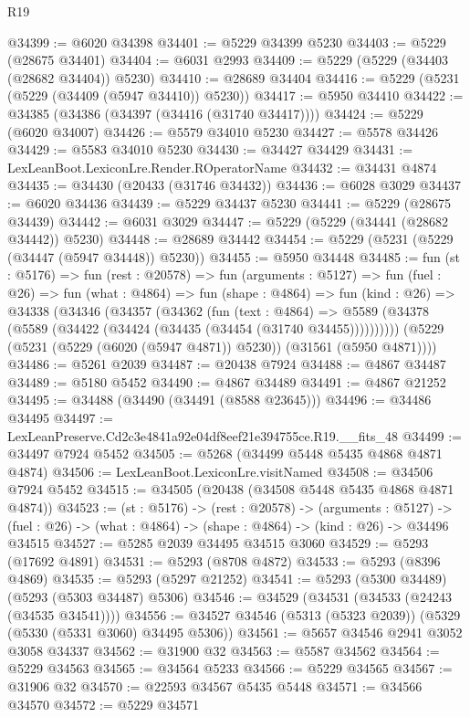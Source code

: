 \begin{lexlean}{R19}
\begin{coremodule}
@34399 := @6020 @34398
@34401 := @5229 @34399 @5230
@34403 := @5229 (@28675 @34401)
@34404 := @6031 @2993
@34409 := @5229 (@5229 (@34403 (@28682 @34404)) @5230)
@34410 := @28689 @34404
@34416 := @5229 (@5231 (@5229 (@34409 (@5947 @34410)) @5230))
@34417 := @5950 @34410
@34422 := @34385 (@34386 (@34397 (@34416 (@31740 @34417))))
@34424 := @5229 (@6020 @34007)
@34426 := @5579 @34010 @5230
@34427 := @5578 @34426
@34429 := @5583 @34010 @5230
@34430 := @34427 @34429
@34431 := LexLeanBoot.LexiconLre.Render.ROperatorName
@34432 := @34431 @4874
@34435 := @34430 (@20433 (@31746 @34432))
@34436 := @6028 @3029
@34437 := @6020 @34436
@34439 := @5229 @34437 @5230
@34441 := @5229 (@28675 @34439)
@34442 := @6031 @3029
@34447 := @5229 (@5229 (@34441 (@28682 @34442)) @5230)
@34448 := @28689 @34442
@34454 := @5229 (@5231 (@5229 (@34447 (@5947 @34448)) @5230))
@34455 := @5950 @34448
@34485 := fun (st : @5176) =>
  fun (rest : @20578) =>
  fun (arguments : @5127) =>
  fun (fuel : @26) =>
  fun (what : @4864) =>
  fun (shape : @4864) =>
  fun (kind : @26) =>
  @34338
    (@34346
      (@34357
        (@34362
          (fun (text : @4864) =>
          @5589 (@34378 (@5589 (@34422 (@34424 (@34435 (@34454 (@31740 @34455))))))))))
      (@5229 (@5231 (@5229 (@6020 (@5947 @4871)) @5230)) (@31561 (@5950 @4871))))
@34486 := @5261 @2039
@34487 := @20438 @7924
@34488 := @4867 @34487
@34489 := @5180 @5452
@34490 := @4867 @34489
@34491 := @4867 @21252
@34495 := @34488 (@34490 (@34491 (@8588 @23645)))
@34496 := @34486 @34495
@34497 := LexLeanPreserve.Cd2c3e4841a92e04df8eef21e394755ce.R19.__fits_48
@34499 := @34497 @7924 @5452
@34505 := @5268 (@34499 @5448 @5435 @4868 @4871 @4874)
@34506 := LexLeanBoot.LexiconLre.visitNamed
@34508 := @34506 @7924 @5452
@34515 := @34505 (@20438 (@34508 @5448 @5435 @4868 @4871 @4874))
@34523 := (st : @5176) ->
  (rest : @20578) ->
  (arguments : @5127) ->
  (fuel : @26) -> (what : @4864) -> (shape : @4864) -> (kind : @26) -> @34496 @34515
@34527 := @5285 @2039 @34495 @34515 @3060
@34529 := @5293 (@17692 @4891)
@34531 := @5293 (@8708 @4872)
@34533 := @5293 (@8396 @4869)
@34535 := @5293 (@5297 @21252)
@34541 := @5293 (@5300 @34489) (@5293 (@5303 @34487) @5306)
@34546 := @34529 (@34531 (@34533 (@24243 (@34535 @34541))))
@34556 := @34527 @34546 (@5313 (@5323 @2039)) (@5329 (@5330 (@5331 @3060) @34495 @5306))
@34561 := @5657 @34546 @2941 @3052 @3058 @34337
@34562 := @31900 @32
@34563 := @5587 @34562
@34564 := @5229 @34563
@34565 := @34564 @5233
@34566 := @5229 @34565
@34567 := @31906 @32
@34570 := @22593 @34567 @5435 @5448
@34571 := @34566 @34570
@34572 := @5229 @34571

\end{coremodule}
\end{lexlean}
